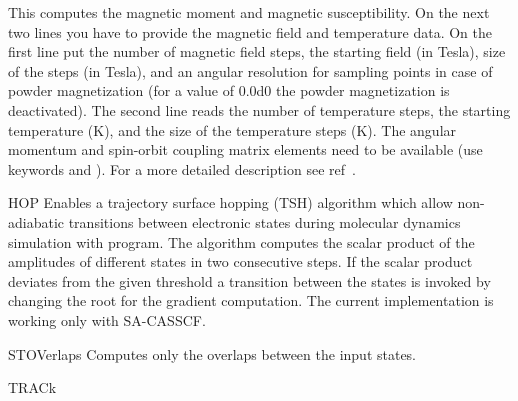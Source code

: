 \begin{keywordlist}
This computes the magnetic moment and magnetic susceptibility.
On the next two lines you have to provide the magnetic field and
temperature data. On the first line put the number of magnetic
field steps, the starting field (in Tesla), size of the steps (in Tesla),
and an angular resolution for sampling points in case of powder magnetization
(for a value of 0.0d0 the powder magnetization is deactivated).
The second line reads the number of temperature steps, the starting
temperature (K), and the size of the temperature steps (K).
The angular momentum and spin-orbit coupling matrix elements
need to be available (use keywords  and ).
For a more detailed description see ref~\cite{MAGN:2009}.
\item[HOP]
Enables a trajectory surface hopping (TSH) algorithm which allow
non-adiabatic transitions between electronic states during molecular
dynamics simulation with  program. The algorithm
computes the scalar product of the amplitudes of different
states in two consecutive steps. If the scalar product
deviates from the given threshold a transition between the states
is invoked by changing the root for the gradient computation.
The current implementation is working only with SA-CASSCF.
\item[STOVerlaps]
Computes only the overlaps between the input states.
\item[TRACk]

\end{keywordlist}
